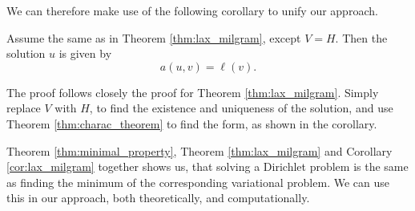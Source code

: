We can therefore make use of the following corollary to unify our approach.
\begin{kor}{\quad}
   Assume the same as in Theorem \ref{thm:lax_milgram}, except $V=H$. Then 
   the solution $u$ is given by 
   \label{cor:lax_milgram}
   \begin{equation*}
    a(u,v) = \ell(v).
   \end{equation*}
   \vspace{-9mm}
\end{kor}
\begin{bev}
    The proof follows closely the proof for Theorem \ref{thm:lax_milgram}. 
    Simply replace $V$ with $H$, to find the existence and uniqueness of the 
    solution, and use Theorem \ref{thm:charac_theorem} to find the form, as 
    shown in the corollary.
\end{bev}
Theorem \ref{thm:minimal_property}, Theorem \ref{thm:lax_milgram} and Corollary 
\ref{cor:lax_milgram} together shows us, that solving a Dirichlet problem is 
the same as finding the minimum of the corresponding variational problem. 
We can use this in our approach, both theoretically, and computationally.